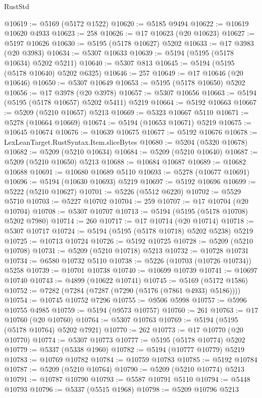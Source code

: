 \begin{lexlean}{RustStd}
\begin{coremodule}
@10619 := @5169 (@5172 @1522)
@10620 := @5185 @9494
@10622 := @10619 @10620 @4933
@10623 := 258
@10626 := @17 @10623 (@20 @10623)
@10627 := @5197 @10626
@10630 := @5195 (@5178 @10627) @5202
@10633 := @17 @3983 (@20 @3983)
@10634 := @5307 @10633
@10639 := @5194 (@5195 (@5178 @10634) @5202 @5211)
@10640 := @5307 @813
@10645 := @5194 (@5195 (@5178 @10640) @5202 @6325)
@10646 := 257
@10649 := @17 @10646 (@20 @10646)
@10650 := @5307 @10649
@10653 := @5195 (@5178 @10650) @5202
@10656 := @17 @3978 (@20 @3978)
@10657 := @5307 @10656
@10663 := @5194 (@5195 (@5178 @10657) @5202 @5411) @5219
@10664 := @5192 @10663
@10667 := @5209 (@5210 @10657) @5213
@10669 := @5323 @10667 @5110
@10671 := @5278 (@10664 @10669)
@10674 := @5194 (@10653 @10671) @5219
@10675 := @10645 @10674
@10676 := @10639 @10675
@10677 := @5192 @10676
@10678 := LexLeanTarget.RustSyntax.Item.sliceBytes
@10680 := @5204 (@5320 @10678)
@10682 := @5209 (@5210 @10634)
@10684 := @5209 (@5210 @10640)
@10687 := @5209 (@5210 @10650) @5213
@10688 := @10684 @10687
@10689 := @10682 @10688
@10691 := @10680 @10689 @5110
@10693 := @5278 (@10677 @10691)
@10696 := @5194 (@10630 @10693) @5219
@10697 := @5192 @10696
@10699 := @5222 (@5210 @10627)
@10701 := @5226 (@5512 @6220)
@10702 := @5529 @5710
@10703 := @5227 @10702
@10704 := 259
@10707 := @17 @10704 (@20 @10704)
@10708 := @5307 @10707
@10713 := @5194 (@5195 (@5178 @10708) @5202 @7980)
@10714 := 260
@10717 := @17 @10714 (@20 @10714)
@10718 := @5307 @10717
@10724 := @5194 (@5195 (@5178 @10718) @5202 @5238) @5219
@10725 := @10713 @10724
@10726 := @5192 @10725
@10728 := @5209 (@5210 @10708)
@10731 := @5209 (@5210 @10718) @5213
@10732 := @10728 @10731
@10734 := @6580 @10732 @5110
@10738 := @5226 (@10703 (@10726 @10734)) @5258
@10739 := @10701 @10738
@10740 := @10699 @10739
@10741 := @10697 @10740
@10743 := @4899 (@10622 @10741)
@10745 := @5169 (@5172 @1586)
@10752 := @7282 (@7284 (@7287 (@7290 (@5176 (@7861 @4933) @5186))))
@10754 := @10745 @10752 @7296
@10755 := @9506 @5998
@10757 := @5996 @10755 @4985
@10759 := @5194 (@9573 @10757)
@10760 := 261
@10763 := @17 @10760 (@20 @10760)
@10764 := @5307 @10763
@10769 := @5194 (@5195 (@5178 @10764) @5202 @7921)
@10770 := 262
@10773 := @17 @10770 (@20 @10770)
@10774 := @5307 @10773
@10777 := @5195 (@5178 @10774) @5202
@10779 := @5337 (@5338 @1960)
@10782 := @5194 (@10777 @10779) @5219
@10783 := @10769 @10782
@10784 := @10759 @10783
@10785 := @5192 @10784
@10787 := @5209 (@5210 @10764)
@10790 := @5209 (@5210 @10774) @5213
@10791 := @10787 @10790
@10793 := @5587 @10791 @5110
@10794 := @5448 @10793
@10796 := @5337 (@5515 @1968)
@10798 := @5209 @10796 @5213

\end{coremodule}
\end{lexlean}
